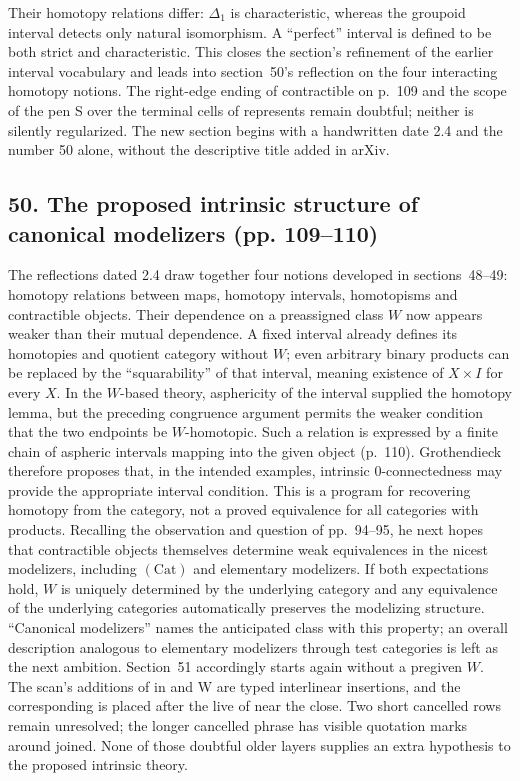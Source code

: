 \documentclass[10pt,oneside]{book}
\begin{document}
Their homotopy relations differ: $\Delta_1$ is characteristic, whereas the groupoid interval detects only natural isomorphism. A ``perfect'' interval is defined to be both strict and characteristic. This closes the section's refinement of the earlier interval vocabulary and leads into section~50's reflection on the four interacting homotopy notions. The right-edge ending of contractible on p.~109 and the scope of the pen S over the terminal cells of represents remain doubtful; neither is silently regularized. The new section begins with a handwritten date 2.4 and the number 50 alone, without the descriptive title added in arXiv.

\subsection*{50. The proposed intrinsic structure of canonical modelizers (pp. 109--110)}
The reflections dated 2.4 draw together four notions developed in sections~48--49: homotopy relations between maps, homotopy intervals, homotopisms and contractible objects. Their dependence on a preassigned class $W$ now appears weaker than their mutual dependence. A fixed interval already defines its homotopies and quotient category without $W$; even arbitrary binary products can be replaced by the ``squarability'' of that interval, meaning existence of $X\times I$ for every $X$. In the $W$-based theory, asphericity of the interval supplied the homotopy lemma, but the preceding congruence argument permits the weaker condition that the two endpoints be $W$-homotopic. Such a relation is expressed by a finite chain of aspheric intervals mapping into the given object (p.~110). Grothendieck therefore proposes that, in the intended examples, intrinsic $0$-connectedness may provide the appropriate interval condition. This is a program for recovering homotopy from the category, not a proved equivalence for all categories with products. Recalling the observation and question of pp.~94--95, he next hopes that contractible objects themselves determine weak equivalences in the nicest modelizers, including $(\mathrm{Cat})$ and elementary modelizers. If both expectations hold, $W$ is uniquely determined by the underlying category and any equivalence of the underlying categories automatically preserves the modelizing structure. ``Canonical modelizers'' names the anticipated class with this property; an overall description analogous to elementary modelizers through test categories is left as the next ambition. Section~51 accordingly starts again without a pregiven $W$. The scan's additions of in and W are typed interlinear insertions, and the corresponding is placed after the live of near the close. Two short cancelled rows remain unresolved; the longer cancelled phrase has visible quotation marks around joined. None of those doubtful older layers supplies an extra hypothesis to the proposed intrinsic theory.
\end{document}
